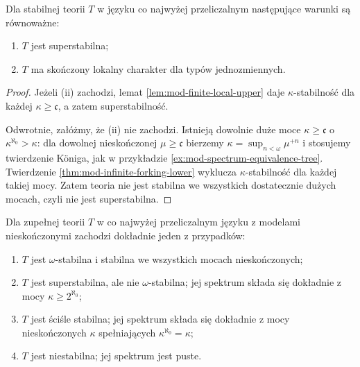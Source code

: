 \begin{twierdzenie}
\label{thm:mod-superstability-finite-local}
Dla stabilnej teorii $T$ w języku
co najwyżej przeliczalnym następujące
warunki są równoważne:
\begin{enumerate}[label=(\roman*)]
\item $T$ jest superstabilna;
\item $T$ ma skończony lokalny charakter
dla typów jednozmiennych.
\end{enumerate}
\end{twierdzenie}
\begin{proof}
Jeżeli (ii) zachodzi, lemat
\ref{lem:mod-finite-local-upper}
daje $\kappa$-stabilność dla każdej
$\kappa\geq\mathfrak c$,
a zatem superstabilność.

Odwrotnie, załóżmy, że (ii) nie zachodzi.
Istnieją dowolnie duże moce
$\kappa\geq\mathfrak c$ o
$\kappa^{\aleph_0}>\kappa$:
dla dowolnej nieskończonej
$\mu\geq\mathfrak c$ bierzemy
$\kappa=\sup_{n<\omega}\mu^{+n}$
i stosujemy twierdzenie Königa,
jak w przykładzie
\ref{ex:mod-spectrum-equivalence-tree}.
Twierdzenie
\ref{thm:mod-infinite-forking-lower}
wyklucza $\kappa$-stabilność
dla każdej takiej mocy.
Zatem teoria nie jest stabilna
we wszystkich dostatecznie dużych
mocach, czyli nie jest superstabilna.
\end{proof}

\begin{twierdzenie}
\label{thm:mod-shelah-spectrum-countable}
Dla zupełnej teorii $T$ w co najwyżej
przeliczalnym języku z modelami nieskończonymi
zachodzi dokładnie jeden z przypadków:
\begin{enumerate}[label=(\roman*)]
\item $T$ jest $\omega$-stabilna i stabilna
we wszystkich mocach nieskończonych;
\item $T$ jest superstabilna, ale nie
$\omega$-stabilna; jej spektrum składa się
dokładnie z mocy $\kappa\geq 2^{\aleph_0}$;
\item $T$ jest ściśle stabilna; jej spektrum
składa się dokładnie z mocy nieskończonych
$\kappa$ spełniających $\kappa^{\aleph_0}=\kappa$;
\item $T$ jest niestabilna; jej spektrum jest puste.
\end{enumerate}
\end{twierdzenie}

